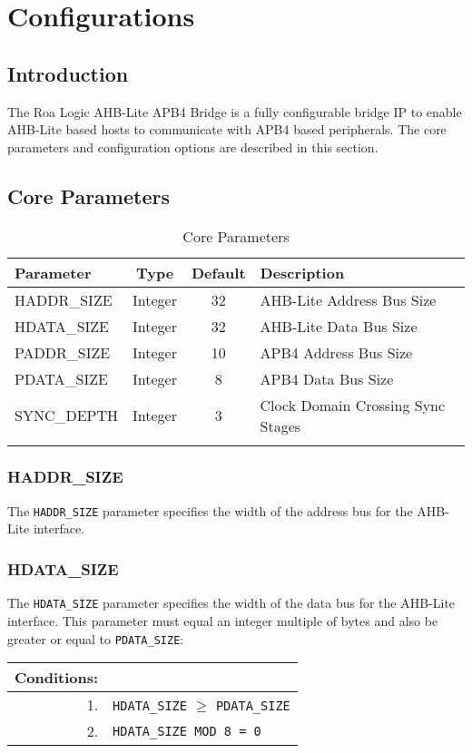 \chapter{Configurations}\label{configurations}

\section{Introduction}\label{introduction-1}

The Roa Logic AHB-Lite APB4
Bridge is a fully configurable bridge IP to enable AHB-Lite based hosts
to communicate with APB4 based peripherals. The core parameters and
configuration options are described in this section.

\section{Core Parameters}\label{core-parameters}

\begin{longtable}[]{@{}lccl@{}}
	\toprule
	Parameter & Type & Default & Description\tabularnewline
	\midrule
	\endhead
	HADDR\_SIZE & Integer & 32 & AHB-Lite Address Bus Size\tabularnewline
	HDATA\_SIZE & Integer & 32 & AHB-Lite Data Bus Size\tabularnewline
	PADDR\_SIZE & Integer & 10 & APB4 Address Bus Size\tabularnewline
	PDATA\_SIZE & Integer & 8  & APB4 Data Bus Size\tabularnewline
	SYNC\_DEPTH & Integer & 3  & Clock Domain Crossing Sync
	Stages\tabularnewline
	\bottomrule
	\caption{Core Parameters}
\end{longtable}

\subsection{HADDR\_SIZE}\label{haddr_size}

The \texttt{HADDR\_SIZE} parameter specifies the width of the address bus for the
AHB-Lite interface.

\subsection{HDATA\_SIZE}\label{hdata_size}

The \texttt{HDATA\_SIZE} parameter specifies the width of the data bus for the
AHB-Lite interface. This parameter must equal an integer multiple of
bytes and also be greater or equal to \texttt{PDATA\_SIZE}:

\begin{longtable}[]{@{}|rp{12cm}@{}}
	\textbf{Conditions}: & \\
	\endhead
	1. & \texttt{HDATA\_SIZE} $\geqslant$ \texttt{PDATA\_SIZE}\\
	2. & \texttt{HDATA\_SIZE MOD 8 = 0}\\
\end{longtable}	            

